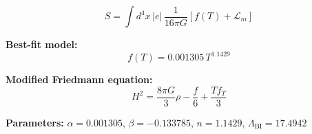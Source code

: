 
\begin{equation}
  S = \int d^4x \, |e| \, \frac{1}{16\pi G} \left[ f(T) + \mathcal{L}_m \right]
\end{equation}

\textbf{Best-fit model:}
\begin{equation}
  f(T) = 0.001305 \, T^{1.1429}
\end{equation}

\textbf{Modified Friedmann equation:}
\begin{equation}
  H^2 = \frac{8\pi G}{3} \rho - \frac{f}{6} + \frac{T f_T}{3}
\end{equation}

\textbf{Parameters:}
$\alpha = 0.001305$, \quad
$\beta = -0.133785$, \quad
$n = 1.1429$, \quad
$\Lambda_{\text{BI}} = 17.4942$